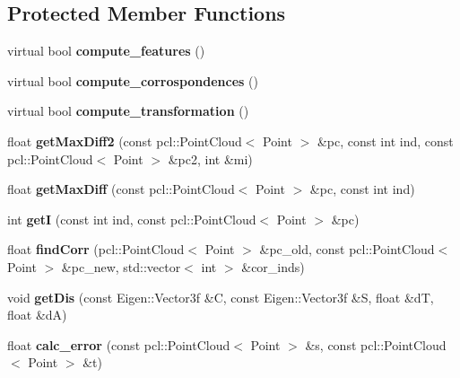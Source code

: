 \subsection*{Protected Member Functions}
\begin{DoxyCompactItemize}
\item 
\hypertarget{classRegistration__Infobased_ab016a8a196669659952729589e8f9c5f}{
virtual bool {\bfseries compute\_\-features} ()}
\label{classRegistration__Infobased_ab016a8a196669659952729589e8f9c5f}

\item 
\hypertarget{classRegistration__Infobased_a6f7b7249d32b0f2f76052d2cbbf8f63e}{
virtual bool {\bfseries compute\_\-corrospondences} ()}
\label{classRegistration__Infobased_a6f7b7249d32b0f2f76052d2cbbf8f63e}

\item 
\hypertarget{classRegistration__Infobased_ac3bd2459aa5b39223aa0faba283f1dc2}{
virtual bool {\bfseries compute\_\-transformation} ()}
\label{classRegistration__Infobased_ac3bd2459aa5b39223aa0faba283f1dc2}

\item 
\hypertarget{classRegistration__Infobased_ac7d1ecf11333c36537d719f96d00b5be}{
float {\bfseries getMaxDiff2} (const pcl::PointCloud$<$ Point $>$ \&pc, const int ind, const pcl::PointCloud$<$ Point $>$ \&pc2, int \&mi)}
\label{classRegistration__Infobased_ac7d1ecf11333c36537d719f96d00b5be}

\item 
\hypertarget{classRegistration__Infobased_a892c4ad907ee8bd98dcc102d89b784ec}{
float {\bfseries getMaxDiff} (const pcl::PointCloud$<$ Point $>$ \&pc, const int ind)}
\label{classRegistration__Infobased_a892c4ad907ee8bd98dcc102d89b784ec}

\item 
\hypertarget{classRegistration__Infobased_aaf9398c5d32e26895c6e14684fb74380}{
int {\bfseries getI} (const int ind, const pcl::PointCloud$<$ Point $>$ \&pc)}
\label{classRegistration__Infobased_aaf9398c5d32e26895c6e14684fb74380}

\item 
\hypertarget{classRegistration__Infobased_a1c553bcad88092d5c1d1ddcf39a128b8}{
float {\bfseries findCorr} (pcl::PointCloud$<$ Point $>$ \&pc\_\-old, const pcl::PointCloud$<$ Point $>$ \&pc\_\-new, std::vector$<$ int $>$ \&cor\_\-inds)}
\label{classRegistration__Infobased_a1c553bcad88092d5c1d1ddcf39a128b8}

\item 
\hypertarget{classRegistration__Infobased_ae1e5447da4c02579fc2186a254c0577c}{
void {\bfseries getDis} (const Eigen::Vector3f \&C, const Eigen::Vector3f \&S, float \&dT, float \&dA)}
\label{classRegistration__Infobased_ae1e5447da4c02579fc2186a254c0577c}

\item 
\hypertarget{classRegistration__Infobased_acbff89b4a2cd7e2f1c1b1b34b0cb8dd9}{
float {\bfseries calc\_\-error} (const pcl::PointCloud$<$ Point $>$ \&s, const pcl::PointCloud$<$ Point $>$ \&t)}
\label{classRegistration__Infobased_acbff89b4a2cd7e2f1c1b1b34b0cb8dd9}

\end{DoxyCompactItemize}
